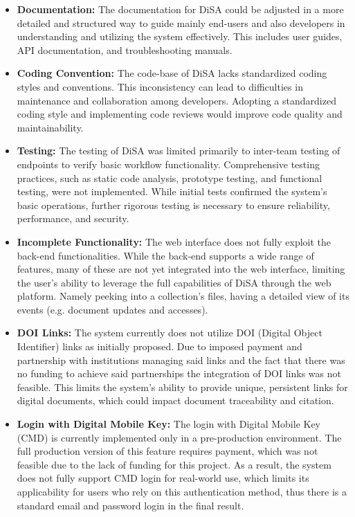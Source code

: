 \documentclass[a4paper,11pt]{article}
\begin{document}
            \begin{itemize}
                \item \textbf{Documentation:} The documentation for DiSA could be adjusted in a more detailed and structured way to guide mainly end-users and also developers in understanding and utilizing the system effectively. This includes user guides, API documentation, and troubleshooting manuals.
    
                \item \textbf{Coding Convention:} The code-base of DiSA lacks standardized coding styles and conventions. This inconsistency can lead to difficulties in maintenance and collaboration among developers. Adopting a standardized coding style and implementing code reviews would improve code quality and maintainability.
    
                \item \textbf{Testing:} The testing of DiSA was limited primarily to inter-team testing of endpoints to verify basic workflow functionality. Comprehensive testing practices, such as static code analysis, prototype testing, and functional testing, were not implemented. While initial tests confirmed the system's basic operations, further rigorous testing is necessary to ensure reliability, performance, and security.
    
                \item \textbf{Incomplete Functionality:} The web interface does not fully exploit the back-end functionalities. While the back-end supports a wide range of features, many of these are not yet integrated into the web interface, limiting the user's ability to leverage the full capabilities of DiSA through the web platform. Namely peeking into a collection's files, having a detailed view of its events (e.g. document updates and accesses).
    
                 \item \textbf{DOI Links:} The system currently does not utilize DOI (Digital Object Identifier) links as initially proposed. Due to imposed payment and partnership with institutions managing said links and the fact that there was no funding to achieve said partnerships the integration of DOI links was not feasible. This limits the system's ability to provide unique, persistent links for digital documents, which could impact document traceability and citation.
    
                \item \textbf{Login with Digital Mobile Key:} The login with Digital Mobile Key (CMD) is currently implemented only in a pre-production environment. The full production version of this feature requires payment, which was not feasible due to the lack of funding for this project. As a result, the system does not fully support CMD login for real-world use, which limits its applicability for users who rely on this authentication method, thus there is a standard email and password login in the final result.
            \end{itemize}
\end{document}
